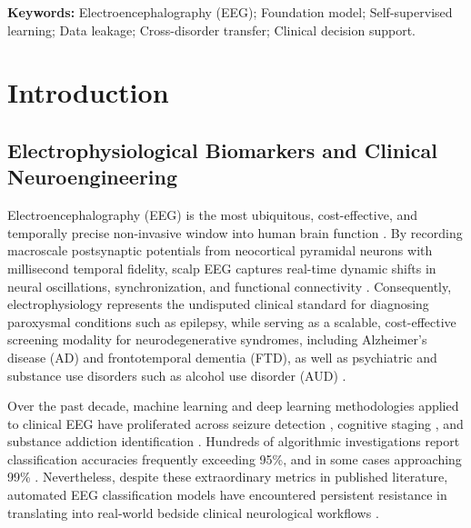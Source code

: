 \documentclass[11pt,a4paper]{article}
\begin{document}
\vspace{0.6em}
\noindent\textbf{Keywords:} Electroencephalography (EEG); Foundation model; Self-supervised learning; Data leakage; Cross-disorder transfer; Clinical decision support.

\vspace{1.0em}

\section{Introduction}
\label{sec:intro}

\subsection{Electrophysiological Biomarkers and Clinical Neuroengineering}
Electroencephalography (EEG) is the most ubiquitous, cost-effective, and temporally precise non-invasive window into human brain function \cite{jasper1958}. By recording macroscale postsynaptic potentials from neocortical pyramidal neurons with millisecond temporal fidelity, scalp EEG captures real-time dynamic shifts in neural oscillations, synchronization, and functional connectivity \cite{babiloni2020}. Consequently, electrophysiology represents the undisputed clinical standard for diagnosing paroxysmal conditions such as epilepsy, while serving as a scalable, cost-effective screening modality for neurodegenerative syndromes, including Alzheimer's disease (AD) and frontotemporal dementia (FTD), as well as psychiatric and substance use disorders such as alcohol use disorder (AUD) \cite{miltiadous2023dementia,openneuro_ds005907,goldberger2000chbmit}.

Over the past decade, machine learning and deep learning methodologies applied to clinical EEG have proliferated across seizure detection \cite{roy2019chrononet}, cognitive staging \cite{babiloni2020}, and substance addiction identification \cite{anuragi2019bspc,anuragi2020bspc,pain2023bspc,shen2023bspc}. Hundreds of algorithmic investigations report classification accuracies frequently exceeding 95\%, and in some cases approaching 99\% \cite{ahmed2026bspc}. Nevertheless, despite these extraordinary metrics in published literature, automated EEG classification models have encountered persistent resistance in translating into real-world bedside clinical neurological workflows \cite{varoquaux2022,little2022}.
\end{document}
